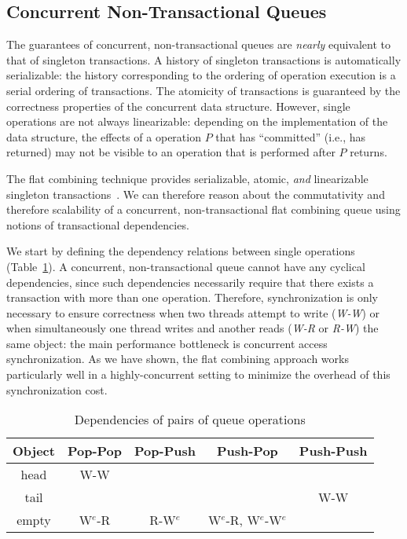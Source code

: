 \subsection{Concurrent Non-Transactional Queues}

The guarantees of concurrent, non-transactional queues are \emph{nearly} equivalent to that of singleton transactions. A history of singleton transactions is automatically serializable: the history corresponding to the ordering of operation execution is a serial ordering of transactions. The atomicity of transactions is guaranteed by the correctness properties of the concurrent data structure. However, single operations are not always linearizable: depending on the implementation of the data structure, the effects of a operation $P$ that has ``committed'' (i.e., has returned) may not be visible to an operation that is performed after $P$ returns.

The flat combining technique provides serializable, atomic, \emph{and} linearizable singleton transactions~\cite{flatcombining}. We can therefore reason about the commutativity and therefore scalability of a concurrent, non-transactional flat combining queue using notions of transactional dependencies.

We start by defining the dependency relations between single operations (Table~\ref{table:queuesimpledeps}). A concurrent, non-transactional queue cannot have any cyclical dependencies, since such dependencies necessarily require that there exists a transaction with more than one operation. Therefore, synchronization is only necessary to ensure correctness when two threads attempt to write (\emph{W-W}) or when simultaneously one thread writes and another reads (\emph{W-R} or \emph{R-W}) the same object: the main performance bottleneck is concurrent access synchronization. As we have shown, the flat combining approach works particularly well in a highly-concurrent setting to minimize the overhead of this synchronization cost.

\begin{table}[t]
    \centering
\begin{tabular}{c||c|c|c|c}
    Object & Pop-Pop & Pop-Push & Push-Pop & Push-Push\\
    \hline
    head & W-W & & & \\
    tail & & & & W-W\\
    empty & W$^e$-R & R-W$^e$ & W$^e$-R, W$^e$-W$^e$ & \\
\end{tabular}
    \caption*{$X$-$Y$ = thread 1 performs operation $X$, thread 2 performs operation $Y$.\\$X^e$ = the operation X modifies the empty status of the queue.\\R-R relations are not shown.}
    \caption{Dependencies of pairs of queue operations}
    \label{table:queuesimpledeps}
\end{table}

